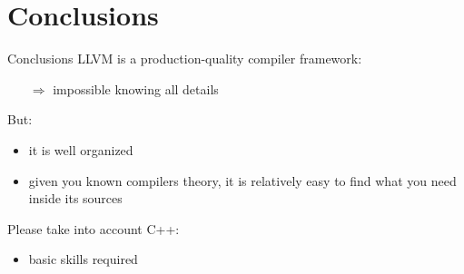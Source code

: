 
\section{Conclusions}
\begin{frame}{Conclusions}
LLVM is a \alert{production-quality} compiler framework:

\begin{itemize}
\item[$\Rightarrow$] impossible knowing all details
\end{itemize}

\vfill
But:

\begin{itemize}
\item it is well organized
\item given you known compilers theory, it is relatively easy to find what you need inside its sources
\end{itemize}

\vfill
Please take into account C++:
\begin{itemize}
\item basic skills required
\end{itemize}
\end{frame}
